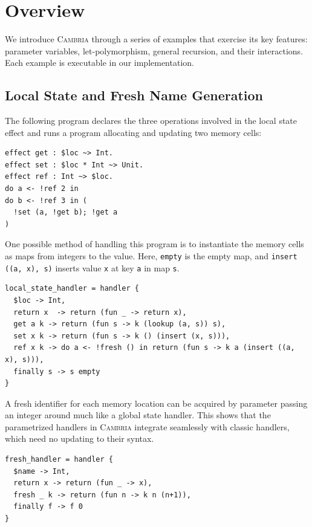 \documentclass[acmsmall,screen,review,anonymous]{acmart}
\newcommand{\cambria}{\textsc{Cambria}}
\begin{document}
\section{Overview}\label{sec:overview}

We introduce \cambria{} through a series of examples that exercise its key features: parameter variables, let-polymorphism, general recursion, and their interactions. Each example is executable in our implementation.

\subsection{Local State and Fresh Name Generation} \label{sec:local-state}

The following program declares the three operations involved in the local state effect and runs a program allocating and updating two memory cells:

\begin{lstlisting}
effect get : $loc ~> Int.
effect set : $loc * Int ~> Unit.
effect ref : Int ~> $loc.
do a <- !ref 2 in
do b <- !ref 3 in (
  !set (a, !get b); !get a
)
\end{lstlisting}

One possible method of handling this program is to instantiate the memory cells as maps from integers to the value.
Here, \lstinline|empty| is the empty map, and \lstinline|insert ((a, x), s)| inserts value \lstinline|x| at key \lstinline|a| in map \lstinline|s|.

\begin{lstlisting}
local_state_handler = handler {
  $loc -> Int,
  return x  -> return (fun _ -> return x),
  get a k -> return (fun s -> k (lookup (a, s)) s),
  set x k -> return (fun s -> k () (insert (x, s))),
  ref x k -> do a <- !fresh () in return (fun s -> k a (insert ((a, x), s))),
  finally s -> s empty
}
\end{lstlisting}

A fresh identifier for each memory location can be acquired by parameter passing an integer around much like a global state handler.
This shows that the parametrized handlers in \cambria{} integrate seamlessly with classic handlers, which need no updating to their syntax.

\begin{lstlisting}
fresh_handler = handler {
  $name -> Int,
  return x -> return (fun _ -> x),
  fresh _ k -> return (fun n -> k n (n+1)),
  finally f -> f 0
}
\end{lstlisting}
\end{document}
